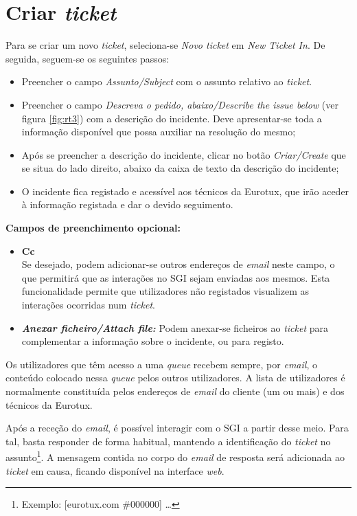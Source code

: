 \section{Criar \textit{ticket}}
Para se criar um novo \textit{ticket}, seleciona-se \emph{Novo \textit{ticket}} em \emph{New Ticket In}. De seguida, seguem-se os seguintes passos:
\begin{itemize}
	\item Preencher o campo \emph{Assunto/\textit{Subject}} com o assunto relativo ao \textit{ticket}.
	\item Preencher o campo \emph{Descreva o pedido, abaixo/\textit{Describe the issue below}} (ver figura \ref{fig:rt3}) com a descrição do incidente. Deve apresentar-se toda a informação disponível que possa auxiliar na resolução do mesmo;
	\item Após se preencher a descrição do incidente, clicar no botão \emph{Criar/\textit{Create}} que se situa do lado direito, abaixo da caixa de texto da descrição do incidente;
	\item O incidente fica registado e acessível aos técnicos da Eurotux, que irão aceder à informação registada e dar o devido seguimento.
\end{itemize}

\bigskip

\textbf{Campos de preenchimento opcional:}
\begin{itemize}
\item \textbf{Cc} \\
Se desejado, podem adicionar-se outros endereços de \textit{email} neste campo, o que permitirá que as interações no SGI sejam enviadas aos mesmos. Esta funcionalidade permite que utilizadores não registados %
visualizem as interações ocorridas num \emph{ticket}.
\item \emph{\textbf{Anexar ficheiro/Attach file:}}
Podem anexar-se ficheiros ao \emph{ticket} para complementar a informação sobre o incidente, ou para registo.
\end{itemize}

\bigskip

Os utilizadores que têm acesso a uma \textit{queue} recebem sempre, por \textit{email}, o conteúdo colocado nessa \emph{queue} pelos outros utilizadores. A lista de utilizadores é normalmente constituída pelos endereços de \textit{email} do cliente (um ou mais) e dos técnicos da Eurotux.

Após a receção do \textit{email}, é possível interagir com o SGI a partir desse meio. Para tal, basta responder de forma habitual, mantendo a identificação do \textit{ticket} no assunto\footnote{Exemplo: [eurotux.com \#000000] \ldots }. A mensagem contida no corpo do \textit{email} de resposta será adicionada ao \textit{ticket} em causa, ficando disponível na interface \textit{web}. 

